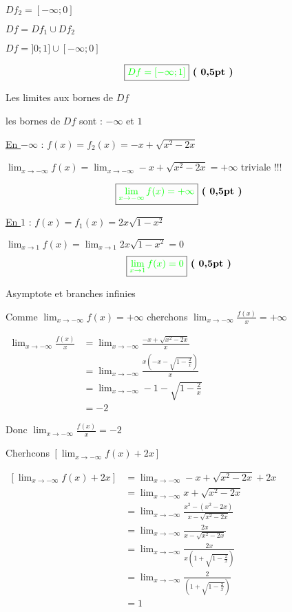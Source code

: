 \documentclass[12pt,a4paper]{article}
\begin{document}
\begin{enumerate}
    \underline{\( Df_2 = [-\infty;0] \)}
	    
	\( Df = Df_1 \cup Df_2 \)    
    
    \( Df = ]0;1] \cup [-\infty;0] \)
    
    \[ \boxed{\textcolor{green}{Df = [-\infty;1]}} \textbf{ ( 0,5pt )} \] 
    
    Les limites aux bornes de \( Df \)
    
	les bornes de \( Df \) sont  :  \(-\infty\) et \( 1 \)
    
\underline{En \(-\infty\)} : \( f(x) = f_{2}(x) = -x + \sqrt{x^2 - 2x} \)

\( \lim_{x \to -\infty} f(x) = \lim_{x \to -\infty} -x + \sqrt{x^2 - 2x} = +\infty \) triviale !!!

\[ \boxed{\textcolor{green}{ \lim_{x \to -\infty} f(x) = +\infty }} \textbf{ ( 0,5pt )} \]

\underline{En \( 1 \)} : \( f(x) = f_{1}(x) = 2x\sqrt{1 - x^2} \)


\( \lim_{x \to 1} f(x) = \lim_{x \to 1} 2x\sqrt{1 - x^2} = 0 \)
\[ \boxed{\textcolor{green}{ \lim_{x \to 1} f(x) = 0 }} \textbf{ ( 0,5pt )} \]

Asymptote et branches infinies

Comme $ \lim_{x \to -\infty} f(x) = +\infty $ cherchons $ \lim_{x \to -\infty} \frac{f(x)}{x} = +\infty $

$
\begin{aligned}
\lim_{x \to -\infty} \frac{f(x)}{x} &=\lim_{x \to -\infty} \frac{-x+\sqrt{x^{2}-2x}}{x} \\
																		&=\lim_{x \to -\infty} \frac{x\left(-x-\sqrt{1-\frac{2}{x}} \right) }{x}\\
																		&=\lim_{x \to -\infty} -1-\sqrt{1-\frac{2}{x}}\\
																		&=-2
\end{aligned}
$

Donc $\lim_{x \to -\infty} \frac{f(x)}{x}=-2$

Cherhcons $ \left[ \lim_{x \to -\infty} f(x) + 2x \right] $

$
\begin{aligned}
\left[ \lim_{x \to -\infty} f(x) + 2x \right] &=\lim_{x \to -\infty} -x+\sqrt{x^{2}-2x}+2x \\
																												&=\lim_{x \to -\infty} x+\sqrt{x^{2}-2x}\\
																												&=\lim_{x \to -\infty} \frac{x^{2}-(x^{2}-2x)}{x-\sqrt{x^{2}-2x}}\\
																												&=\lim_{x \to -\infty} \frac{2x}{x-\sqrt{x^{2}-2x}}\\
																												&=\lim_{x \to -\infty} \frac{2x}{x\left( 1+\sqrt{1-\frac{2}{x} }\right)}\\
																												&=\lim_{x \to -\infty} \frac{2}{\left( 1+\sqrt{1-\frac{2}{x} }\right)}\\
																												&=1
\end{aligned}
$


\end{enumerate}
\end{document}

